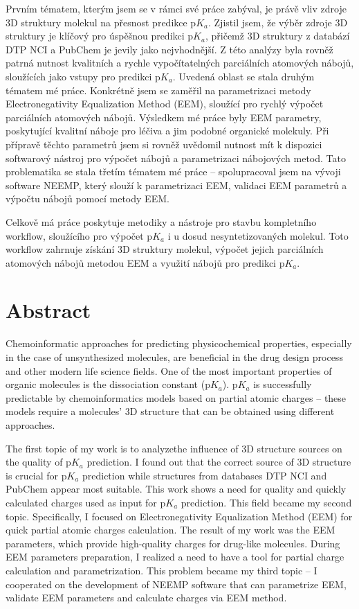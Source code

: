\documentclass[11pt,b5paper,oneside,final]{book}
\begin{document}
Prvním tématem, kterým jsem se v rámci své práce zabýval, je právě vliv zdroje
3D struktury molekul na přesnost predikce p$K_a$. Zjistil jsem, že výběr zdroje
3D struktury je klíčový pro úspěšnou predikci p$K_a$, přičemž 3D struktury
z databází DTP NCI a PubChem je jevily jako nejvhodnější. Z této analýzy byla
rovněž patrná nutnost kvalitních a rychle vypočítatelných parciálních atomových
nábojů, sloužících jako vstupy pro predikci p$K_a$. Uvedená oblast se stala
druhým tématem mé práce. Konkrétně jsem se zaměřil na parametrizaci metody
Electronegativity Equalization Method (EEM), sloužící pro rychlý vý\-po\-čet
parciálních atomových nábojů. Výsledkem mé práce byly EEM parametry,
poskytující kvalitní náboje pro léčiva a jim podobné organické molekuly.
Při přípravě těchto parametrů jsem si
rovněž uvědomil nutnost mít k dispozici softwarový nástroj pro výpočet nábojů a
pa\-ra\-me\-tri\-za\-ci nábojových metod. Tato problematika se stala třetím tématem mé
práce -- spo\-lu\-pra\-co\-val jsem na vývoji software NEEMP, který slouží
k parametrizaci EEM, validaci EEM parametrů a výpočtu nábojů pomocí metody EEM.

Celkově má práce poskytuje metodiky a nástroje pro stavbu kompletního workflow,
sloužícího pro výpočet p$K_a$ i u dosud nesyntetizovaných molekul. Toto workflow
zahrnuje získání 3D struktury molekul, výpočet jejich parciálních atomových
nábojů metodou EEM a využití nábojů pro predikci p$K_a$.
\clearpage

\section*{Abstract}
Chemoinformatic approaches for predicting physicochemical properties, especially
in the case of unsynthesized molecules, are beneficial in the drug design
process and other modern life science fields. One of the most important
properties of organic molecules is the dissociation constant (p$K_a$). p$K_a$ is
successfully predictable by chemoinformatics models based on partial atomic
charges -- these models require a molecules’ 3D structure that can be obtained
using different approaches. 

The first topic of my work is to analyzethe influence of 3D structure sources
on the quality of p$K_a$ prediction. I found out that the correct source
of 3D structure is crucial for p$K_a$ prediction while structures from databases
DTP NCI and PubChem appear most suitable. This work shows a need for quality and
quickly calculated charges used as input for p$K_a$ prediction. This field became
my second topic. Specifically, I focused on Electronegativity Equalization Method
(EEM) for quick partial atomic charges calculation. The result of my work was
the EEM parameters, which provide high-quality charges for drug-like molecules.
During EEM parameters preparation, I realized a need to have a tool for partial
charge calculation and parametrization. This problem became my third topic -- I
cooperated on the development of NEEMP software that can parametrize EEM, validate
EEM parameters and calculate charges via EEM method.
\end{document}
